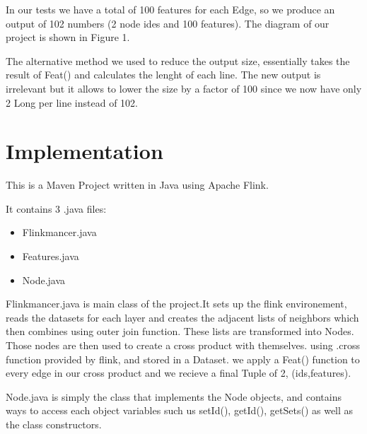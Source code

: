 In our tests we have a total of 100 features for each Edge, so we produce an output of 102 numbers (2 node ides and 100 features). The diagram of our project is shown in Figure 1.

The alternative method we used to reduce the output size, essentially takes the result of Feat() and calculates the lenght of each line. The new output is irrelevant but it allows to lower the size by a factor of 100 since we now have only 2 Long per line instead of 102.



\section{Implementation}

This is a Maven Project written in Java using Apache Flink. 

It contains 3 .java files:
\begin{itemize} 
\item Flinkmancer.java
\item Features.java
\item Node.java
\end{itemize}

Flinkmancer.java is main class of the project.It sets up the flink environement, reads the datasets for each layer and creates the adjacent lists of neighbors which then combines using outer join function. These lists are transformed into Nodes. Those nodes are then used to create a cross product with themselves. using .cross function provided by flink, and stored in a Dataset. we apply a Feat() function to every edge in our cross product and we recieve a final Tuple of 2, (ids,features). \newline

Node.java is simply the class that implements the Node objects, and contains ways to access each object variables such us setId(), getId(), getSets() as well as the class constructors. \newline


